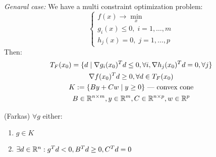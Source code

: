 \emph{Genaral case:} 
We have a multi constraint optimization problem: 
\[ 
    \begin{cases}
        f(x) \to \min_x \\ 
        g_i(x) \leq 0, \; i = 1, \ldots, m \\ 
        h_j (x) = 0, \; j = 1, \ldots, p
    \end{cases}
\] 
Then: 
\begin{gather*}
    T_F(x_0) = \{ d \mid \nabla g_i(x_0)^T d \leq 0, \forall i, \nabla h_j(x_0)^T d = 0, \forall j \} \\
    \nabla f (x_0)^T d \geq 0, \forall d \in T_F(x_0) \\ 
    K := \{ B y + C w \mid y \geq 0 \} \text{ --- convex cone} \\
    B \in \mathbb{R}^{n \times m}, y \in \mathbb{R}^m, C \in \mathbb{R}^{n \times p}, w \in \mathbb{R}^p \\
\end{gather*}


\begin{lemma} (Farkas)
    $\forall g$ either: 
    \begin{enumerate}
        \item $g \in K$
        \item $\exists d \in \mathbb{R}^n : g^T d < 0, B^T d \geq 0, C^T d = 0$
    \end{enumerate}
\end{lemma}